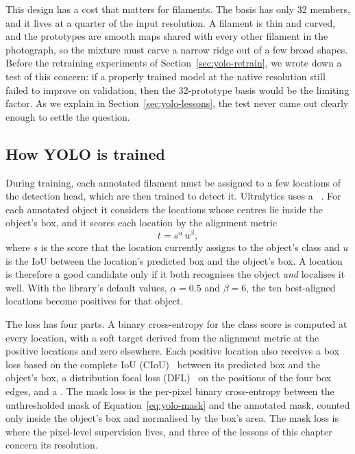 This design has a cost that matters for filaments. The basis has only 32 members, and it lives at a
quarter of the input resolution. A filament is thin and curved, and the prototypes are smooth maps
shared with every other filament in the photograph, so the mixture must carve a narrow ridge out of
a few broad shapes. Before the retraining experiments of Section~\ref{sec:yolo-retrain}, we wrote
down a test of this concern: if a properly trained model at the native resolution still failed to
improve on validation, then the 32-prototype basis would be the limiting factor. As we explain in
Section~\ref{sec:yolo-lessons}, the test never came out clearly enough to settle the question.

\subsection{How YOLO is trained}\label{sec:yolo-training}
During training, each annotated filament must be assigned to a few locations of the detection head,
which are then trained to detect it. Ultralytics uses a ~\citep{feng2021tood,ultralytics}. For each annotated object it considers the locations whose centres
lie inside the object's box, and it scores each location by the alignment metric
\begin{equation}
t = s^{\alpha}\,u^{\beta},
\end{equation}
where $s$ is the score that the location currently assigns to the object's class and $u$ is the IoU
between the location's predicted box and the object's box. A location is therefore a good candidate
only if it both recognises the object \emph{and} localises it well. With the library's default
values, $\alpha=0.5$ and $\beta=6$, the ten best-aligned locations become positives for that object.

The loss has four parts. A binary cross-entropy for the class score is computed at every location,
with a soft target derived from the alignment metric at the positive locations and zero elsewhere.
Each positive location also receives a box loss based on the complete IoU
(CIoU)~\citep{zheng2020diou} between its predicted box and the object's box, a distribution focal
loss (DFL)~\citep{li2020gfl} on the positions of the four box edges, and a . The mask loss is the per-pixel binary cross-entropy between the
unthresholded mask of Equation~\eqref{eq:yolo-mask} and the annotated mask, counted only inside the
object's box and normalised by the box's area. The mask loss is where the pixel-level supervision
lives, and three of the lessons of this chapter concern its resolution.

